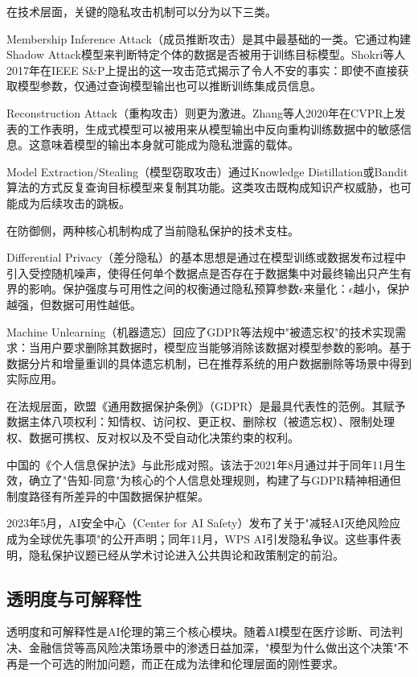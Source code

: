 \documentclass[12pt,a4paper]{ctexart}
\begin{document}
在技术层面，关键的隐私攻击机制可以分为以下三类。

Membership Inference Attack（成员推断攻击）是其中最基础的一类。它通过构建Shadow Attack模型来判断特定个体的数据是否被用于训练目标模型。Shokri等人2017年在IEEE S\&P上提出的这一攻击范式揭示了令人不安的事实：即使不直接获取模型参数，仅通过查询模型输出也可以推断训练集成员信息。

Reconstruction Attack（重构攻击）则更为激进。Zhang等人2020年在CVPR上发表的工作表明，生成式模型可以被用来从模型输出中反向重构训练数据中的敏感信息。这意味着模型的输出本身就可能成为隐私泄露的载体。

Model Extraction/Stealing（模型窃取攻击）通过Knowledge Distillation或Bandit算法的方式反复查询目标模型来复制其功能。这类攻击既构成知识产权威胁，也可能成为后续攻击的跳板。

在防御侧，两种核心机制构成了当前隐私保护的技术支柱。

Differential Privacy（差分隐私）的基本思想是通过在模型训练或数据发布过程中引入受控随机噪声，使得任何单个数据点是否存在于数据集中对最终输出只产生有界的影响。保护强度与可用性之间的权衡通过隐私预算参数$\epsilon$来量化：$\epsilon$越小，保护越强，但数据可用性越低。

Machine Unlearning（机器遗忘）回应了GDPR等法规中"被遗忘权"的技术实现需求：当用户要求删除其数据时，模型应当能够消除该数据对模型参数的影响。基于数据分片和增量重训的具体遗忘机制，已在推荐系统的用户数据删除等场景中得到实际应用。

在法规层面，欧盟《通用数据保护条例》（GDPR）是最具代表性的范例。其赋予数据主体八项权利：知情权、访问权、更正权、删除权（被遗忘权）、限制处理权、数据可携权、反对权以及不受自动化决策约束的权利。

中国的《个人信息保护法》与此形成对照。该法于2021年8月通过并于同年11月生效，确立了"告知-同意"为核心的个人信息处理规则，构建了与GDPR精神相通但制度路径有所差异的中国数据保护框架。

2023年5月，AI安全中心（Center for AI Safety）发布了关于"减轻AI灭绝风险应成为全球优先事项"的公开声明；同年11月，WPS AI引发隐私争议。这些事件表明，隐私保护议题已经从学术讨论进入公共舆论和政策制定的前沿。

\subsection{透明度与可解释性}

透明度和可解释性是AI伦理的第三个核心模块。随着AI模型在医疗诊断、司法判决、金融信贷等高风险决策场景中的渗透日益加深，"模型为什么做出这个决策"不再是一个可选的附加问题，而正在成为法律和伦理层面的刚性要求。
\end{document}
